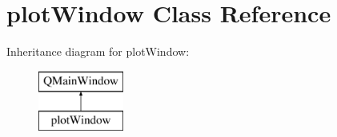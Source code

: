 \hypertarget{classplot_window}{}\section{plot\+Window Class Reference}
\label{classplot_window}
Inheritance diagram for plot\+Window\+:\begin{figure}[H]
\begin{center}
\leavevmode
\includegraphics[height=2.000000cm]{classplot_window}
\end{center}
\end{figure}
